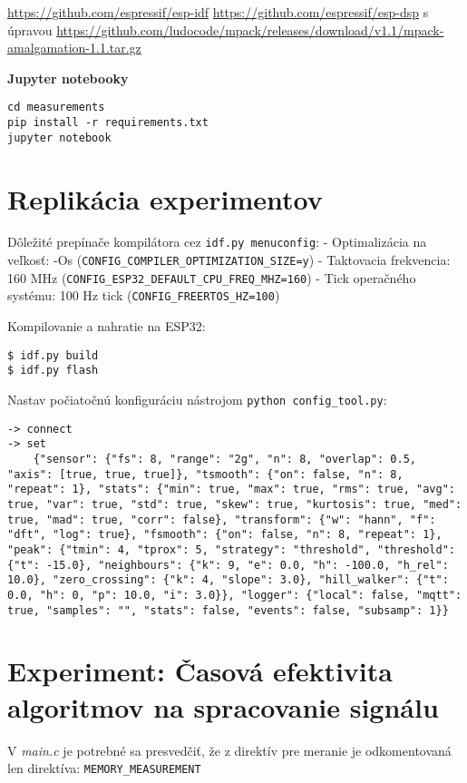 \url{https://github.com/espressif/esp-idf}
\url{https://github.com/espressif/esp-dsp} s úpravou
\url{https://github.com/ludocode/mpack/releases/download/v1.1/mpack-amalgamation-1.1.tar.gz}

\textbf{Jupyter notebooky}
\begin{lstlisting}[style=messages]
cd measurements
pip install -r requirements.txt
jupyter notebook
\end{lstlisting}

\section{Replikácia experimentov}

Dôležité prepínače kompilátora cez \verb|idf.py menuconfig|:
    - Optimalizácia na veľkosť: -Os (\verb|CONFIG_COMPILER_OPTIMIZATION_SIZE=y|)
    - Taktovacia frekvencia: 160 MHz   (\verb|CONFIG_ESP32_DEFAULT_CPU_FREQ_MHZ=160|)
    - Tick operačného systému: 100 Hz tick  (\verb|CONFIG_FREERTOS_HZ=100|)
    
Kompilovanie a nahratie na ESP32:

\begin{lstlisting}[style=messages]
$ idf.py build
$ idf.py flash
\end{lstlisting}

Nastav počiatočnú konfiguráciu nástrojom \verb|python config_tool.py|:

\begin{lstlisting}[style=messages]
-> connect
-> set
    {"sensor": {"fs": 8, "range": "2g", "n": 8, "overlap": 0.5, "axis": [true, true, true]}, "tsmooth": {"on": false, "n": 8, "repeat": 1}, "stats": {"min": true, "max": true, "rms": true, "avg": true, "var": true, "std": true, "skew": true, "kurtosis": true, "med": true, "mad": true, "corr": false}, "transform": {"w": "hann", "f": "dft", "log": true}, "fsmooth": {"on": false, "n": 8, "repeat": 1}, "peak": {"tmin": 4, "tprox": 5, "strategy": "threshold", "threshold": {"t": -15.0}, "neighbours": {"k": 9, "e": 0.0, "h": -100.0, "h_rel": 10.0}, "zero_crossing": {"k": 4, "slope": 3.0}, "hill_walker": {"t": 0.0, "h": 0, "p": 10.0, "i": 3.0}}, "logger": {"local": false, "mqtt": true, "samples": "", "stats": false, "events": false, "subsamp": 1}}
\end{lstlisting}

\section{Experiment: Časová efektivita algoritmov na spracovanie signálu}
V \emph{main.c} je potrebné sa presvedčiť, že z direktív pre meranie je odkomentovaná len direktíva: 
\verb|MEMORY_MEASUREMENT|

